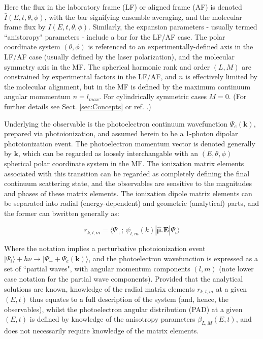 Here the flux in the laboratory frame (LF) or aligned frame (AF) is denoted $\bar{I}(E,t,\theta,\phi)$, with the bar signifying ensemble averaging, and the molecular frame flux by $I(E,t,\theta,\phi)$. Similarly, the expansion parameters - usually termed ``anistoropy" parameters - include a bar for the LF/AF case. The polar coordinate system $(\theta,\phi)$ is referenced to an experimentally-defined axis in the LF/AF case (usually defined by the laser polarization), and the molecular symmetry axis in the MF. The spherical harmonic rank and order $(L,M)$ are constrained by experimental factors in the LF/AF, and $n$ is effectively limited by the molecular alignment, but in the MF is defined by the maximum continuum angular mommentum $n=l_{max}$. For cylindrically symmetric cases $M=0$. (For further details see Sect. \ref{sec:Concepts} or ref. \cite{hockett2018QMP1}.)

Underlying the observable is the photoelectron continuum wavefunction $\Psi_{e}(\boldsymbol{\mathbf{k}})$, prepared via photoionization, and assumed herein to be a 1-photon dipolar photoionization event. The photoelectron momentum vector is denoted generally by $\boldsymbol{\mathbf{k}}$, which can be regarded as loosely interchangable with an $(E,\theta,\phi)$ spherical polar coordinate system in the MF. The ionization matrix elements associated with this transition can be regarded as completely defining the final continuum scattering state, and the observables are sensitive to the magnitudes and phases of these matrix elements. The ionization dipole matrix elements can be separated into radial (energy-dependent) and geometric (analytical) parts, and the former can bwritten generally as:

\begin{equation}
r_{k,l,m}=\langle\Psi_{+};\,\psi_{l,m}(k)|\hat{\mathbf{\mu}}.\boldsymbol{\mathbf{E}}|\Psi_{i}\rangle\label{eq:r-kllam}
\end{equation}

Where the notation implies a perturbative photoionization event %
$|\Psi_{i}\rangle+h\nu{\rightarrow}|\Psi_{+}+\Psi_{e}(\boldsymbol{\mathbf{k}})\rangle$, and the photoelectron wavefunction is expressed as a set of ``partial waves", with angular momentum components $(l,m)$ (note lower case notation for the partial wave components). Provided that the analytical solutions are known, knowledge of the radial matrix elements $r_{k,l,m}$ at a given $(E,t)$ thus equates to a full description of the system (and, hence, the observables), whilst the photoelectron angular distribution (PAD) at a given $(E,t)$ is defined by knowledge of the anisotropy parameters $\beta_{L,M}(E,t)$, and does not necessarily require knowledge of the matrix elements.

